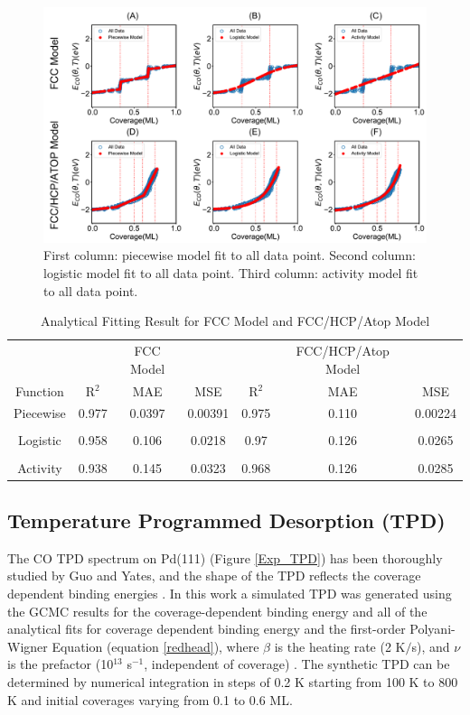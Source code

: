 \documentclass[11pt]{article}
\begin{document}
\begin{figure} [h]
\centering
\includegraphics[width=15cm]{Figure/fitting13.pdf}
\caption{First column: piecewise model fit to all data point. Second column: logistic model fit to all data point. Third column: activity model fit to all data point.}
\label{fit13}
\end{figure}

\begin{table} [h]
\caption{Analytical Fitting Result for FCC Model and FCC/HCP/Atop Model }
\centering
\setlength{\tabcolsep}{6pt}
\renewcommand{\arraystretch}{1.5}
\begin{tabular} {c c c c c c c}
\toprule
 & & FCC Model& & & FCC/HCP/Atop Model\\
\cmidrule[\heavyrulewidth](lr){2-4}\cmidrule[\heavyrulewidth](lr){5-7}
Function & R$^2$&MAE&MSE& R$^2$&MAE&MSE\\
\midrule
Piecewise   &0.977 &0.0397&0.00391&0.975&0.110&0.00224\\
\\
Logistic  & 0.958 &0.106&0.0218&0.97&0.126&0.0265\\
\\
Activity  & 0.938 &0.145&0.0323&0.968&0.126&0.0285 \\
\bottomrule
\end{tabular}
\label{sumfit}
\end{table}

\clearpage
\subsection{Temperature Programmed Desorption (TPD)}

The CO TPD spectrum on Pd(111) (Figure \ref{Exp_TPD}) has been thoroughly studied by Guo and Yates, and the shape of the TPD reflects the coverage dependent binding energies \cite{Guo1989}. In this work a simulated TPD was generated using the GCMC results for the coverage-dependent binding energy and all of the analytical fits for coverage dependent binding energy and the first-order Polyani-Wigner Equation (equation \ref{redhead}), where $\beta$ is the heating rate (2 K$/$s), and $\nu$ is the prefactor (10$^{13}$ s$^{-1}$, independent of coverage) \cite{Redhead1962}. The synthetic TPD can be determined by numerical integration in steps of 0.2 K starting from 100 K to 800 K and initial coverages varying from 0.1 to 0.6 ML.
\end{document}
